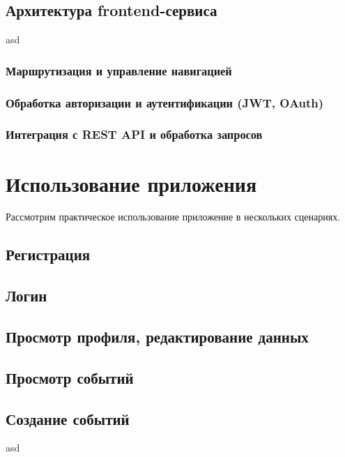 \documentclass[diploma]{SCWorks}
\begin{document}
\subsection{Архитектура frontend-сервиса}

asd

\subsubsection{Маршрутизация и управление навигацией}

\subsubsection{Обработка авторизации и аутентификации (JWT, OAuth)}

\subsubsection{Интеграция с REST API и обработка запросов}

\section{Использование приложения}

Рассмотрим практическое использование приложение в нескольких сценариях.

\subsection{Регистрация}

\subsection{Логин}

\subsection{Просмотр профиля, редактирование данных}

\subsection{Просмотр событий}

\subsection{Создание событий}

asd
\end{document}

